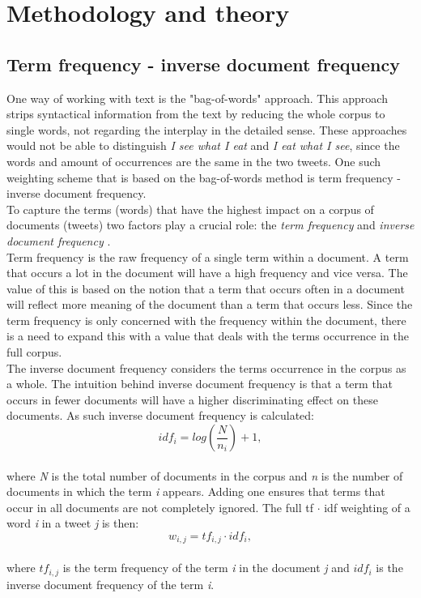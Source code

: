 
\section{Methodology and theory}

\subsection{Term frequency - inverse document frequency}
One way of working with text is the "bag-of-words" approach. This approach strips syntactical information from the text by reducing the whole corpus to single words, not regarding the interplay in the detailed sense. These approaches would not be able to distinguish \textit{I see what I eat} and \textit{I eat what I see}, since the words and amount of occurrences are the same in the two tweets. One such weighting scheme that is based on the bag-of-words method is term frequency - inverse document frequency.\\
To capture the terms (words) that have the highest impact on a corpus of documents (tweets) two factors play a crucial role: the \textit{term frequency} and \textit{inverse document frequency} \cite{speech}.\\
Term frequency is the raw frequency of a single term within a document. A term that occurs a lot in the document will have a high frequency and vice versa. The value of this is based on the notion that a term that occurs often in a document will reflect more meaning of the document than a term that occurs less. Since the term frequency is only concerned with the frequency within the document, there is a need to expand this with a value that deals with the terms occurrence in the full corpus.\\
The inverse document frequency considers the terms occurrence in the corpus as a whole. The intuition behind inverse document frequency is that a term that occurs in fewer documents will have a higher discriminating effect on these documents. As such inverse document frequency is calculated:\\
\begin{equation} 
id f_{i} = log \left(\dfrac{N}{n_{i}}\right)+1,
\end{equation}\\
where \textit{N} is the total number of documents in the corpus and \textit{n} is the number of documents in which the term \textit{i} appears. Adding one ensures that terms that occur in all documents are not completely ignored. The full tf $\cdot$ idf weighting of a word \textit{i} in a tweet \textit{j} is then:\\
\begin{equation} 
w_{i,j}= tf_{i,j}\cdot id f_{i},
\end{equation}\\
where $tf_{i,j}$ is the term frequency of the term \textit{i} in the document \textit{j} and $id f_{i}$ is the inverse document frequency of the term \textit{i}.


